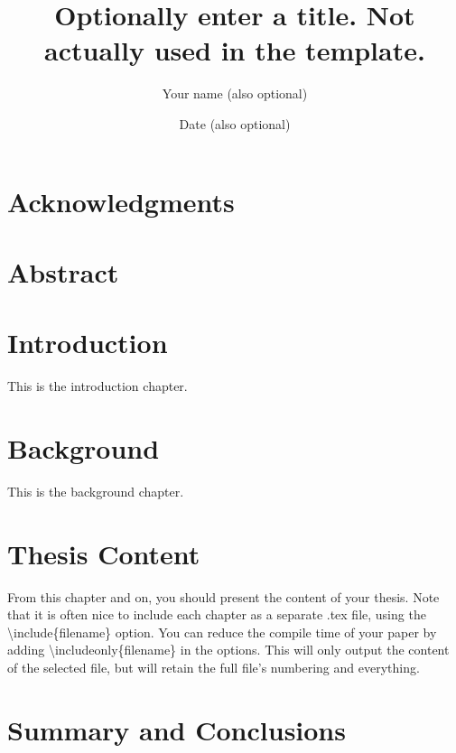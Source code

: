 \documentclass[a4paper,12pt,oneside]{book}
\title{Optionally enter a title. Not actually used in the template.}
\author{Your name (also optional)}
\date{Date (also optional)}
\begin{document}
\pagestyle{fancy}



\chapter*{Acknowledgments}

\chapter*{Abstract}


\tableofcontents


\listoffigures




\chapter{Introduction}
\label{sec_intro}

This is the introduction chapter.


\chapter{Background}
\label{sec_background}

This is the background chapter.


\chapter{Thesis Content}
From this chapter and on, you should present the content of your thesis. 
Note that it is often nice to include each chapter as a separate .tex file, using the \textbackslash include\{filename\} option.
You can reduce the compile time of your paper by adding \textbackslash includeonly\{filename\} in the options. 
This will only output the content of the selected file, but will retain the full file's numbering and everything.




\chapter{Summary and Conclusions}
\label{sec_conclusions}
\end{document}
